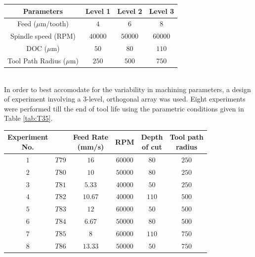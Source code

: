 \documentclass[preprint,review,12pt]{elsarticle}
\begin{document}
\begin{minipage}{\linewidth}
\begin{center}
 \label{tab:T33}
\begin{tabular}{ c | c c c}
	\hline
	Parameters & Level 1 & Level 2 & Level 3 \\
	\hline\hline
 	Feed ($\mu${m}/tooth) & $4$ & $6$ & $8$ \\
 	\hline
 	Spindle speed (RPM) & $40000$ & $50000$ & $60000$ \\
 	\hline
  DOC ($\mu${m}) & $50$ & $80$ & $110$ \\
  \hline
  Tool Path Radius ($\mu${m}) & $250$ & $500$ & $750$ \\
  \hline
\end{tabular}
\end{center}
\end{minipage} \\

 In order to best accomodate for the variability in machining parameters, a design of experiment involving a $3$-level, orthogonal array was used. Eight experiments were performed till the end of tool life using the parametric conditions given in Table \ref{tab:T35}. \par

\begin{minipage}{\linewidth}
   \label{tab:T35}
  \centering
    \begin{tabular}{ c | c c c c c }
    	\hline
    	\makecell{Experiment \\ No.} & \makecell{Tool Id} & \makecell{Feed Rate \\ (mm/s)} & RPM & \makecell{Depth \\ of cut} & \makecell{Tool path \\ radius} \\
    	\hline\hline
      $1$ & $T79$ & $16$	& $60000$ &	$80$ & $250$ \\
      \hline
      $2$ & $T80$ & $10$	& $50000$ &	$80$ & $250$ \\
      \hline
     	$3$ &	$T81$ & $5.33$	& $40000$ &	$50$ & $250$ \\
     	\hline
      $4$ & $T82$ & $10.67$	& $40000$ &	$110$ & $500$ \\
      \hline
      $5$ & $T83$ & $12$	& $60000$ &	$50$ & $500$ \\
      \hline
     	$6$ &	$T84$ & $6.67$	& $50000$ &	$80$ & $500$ \\
     	\hline
      $7$ & $T85$ & $8$	& $60000$ &	$110$ & $750$ \\
      \hline
      $8$ & $T86$ & $13.33$	& $50000$ &	$50$ & $750$ \\
      \hline

    \end{tabular}
\end{minipage} \\\\
\end{document}
